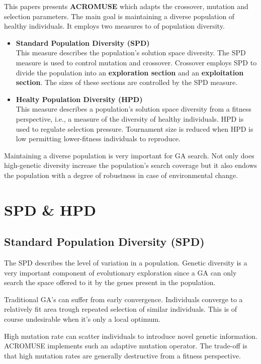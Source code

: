 \documentclass[../main.tex]{subfiles}
\begin{document}
This papers presents \textbf{ACROMUSE} which adapts the crossover, mutation and selection parameters. The main goal is
maintaining a diverse population of healthy individuals. It employs two measures to of population diversity.

\begin{itemize}
	\item \textbf{Standard Population Diversity (SPD)} \\
	This measure describes the population's solution space diversity. The SPD measure is used to control mutation and
	crossover. Crossover employs SPD to divide the population into an \textbf{exploration section} and an
	\textbf{exploitation section}. The sizes of these sections are controlled by the SPD measure.
	\item \textbf{Healty Population Diversity (HPD)} \\
	This measure describes a population’s solution space diversity from a fitness perspective, i.e., a measure of the
	diversity of healthy individuals. HPD is used to regulate selection pressure. Tournament size is reduced when HPD
	is low permitting lower-fitness individuals to reproduce.
\end{itemize}

Maintaining a diverse population is very important for GA search. Not only does high-genetic diversity increase the
population's search coverage but it also endows the population with a degree of robustness in case of environmental
change.

\section{SPD \& HPD}

\subsection{Standard Population Diversity (SPD)}
The SPD describes the level of variation in a population. Genetic diversity is a very important component of
evolutionary exploration since a GA can only search the space offered to it by the genes present in the population.

Traditional GA's can suffer from early convergence. Individuals converge to a relatively fit area trough repeated
selection of similar individuals. This is of course undesirable when it's only a local optimum.

High mutation rate can scatter individuals to introduce novel genetic information. ACROMUSE implements such an adaptive
mutation operator. The trade-off is that high mutation rates are generally destructive from a fitness perspective.
\end{document}
